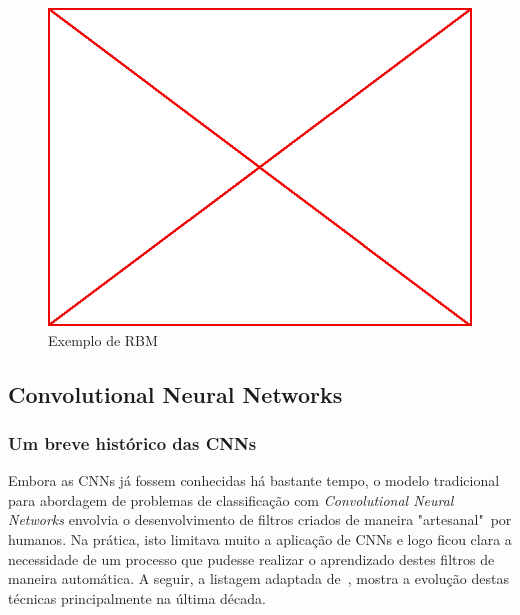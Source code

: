 \begin{figure}
  \caption{Exemplo de RBM}
  \begin{center}
    \includegraphics[scale=0.5]{placeholder}
  \end{center}
\end{figure}

\subsection{Convolutional Neural Networks}

\subsubsection{Um breve histórico das CNNs}

Embora as CNNs já fossem conhecidas há bastante tempo, o modelo tradicional
para abordagem de problemas de classificação com \emph{Convolutional Neural
  Networks} envolvia o desenvolvimento de filtros criados de maneira
"artesanal"~por humanos. Na prática, isto limitava muito a aplicação de CNNs e
logo ficou clara a necessidade de um processo que pudesse realizar o
aprendizado destes filtros de maneira automática. A seguir, a listagem adaptada
de~\citet{cs231n}, mostra a evolução destas técnicas principalmente na última
década.

